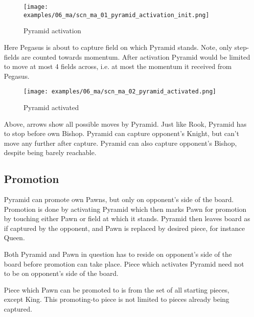 \noindent
\begin{figure}[!h]
\texttt{[image: examples/06\_ma/scn\_ma\_01\_pyramid\_activation\_init.png]}
\caption{Pyramid activation}
\label{fig:scn_ma_01_pyramid_activation_init}
\end{figure}

Here Pegasus is about to capture field on which Pyramid stands. Note, only
step-fields are counted towards momentum. After activation Pyramid would be
limited to move at most 4 fields across, i.e. at most the momentum it received
from Pegasus.

\clearpage %

\noindent
\begin{figure}[!h]
\texttt{[image: examples/06\_ma/scn\_ma\_02\_pyramid\_activated.png]}
\caption{Pyramid activated}
\label{fig:scn_ma_02_pyramid_activated}
\end{figure}

Above, arrows show all possible moves by Pyramid. Just like Rook, Pyramid has to
stop before own Bishop. Pyramid can capture opponent's Knight, but can't move any
further after capture. Pyramid can also capture opponent's Bishop, despite being
barely reachable.

\clearpage %

\subsection*{Promotion}
\label{sec:Mayan Ascendancy/Pyramid/Promotion}

Pyramid can promote own Pawns, but only on opponent's side of the board.
Promotion is done by activating Pyramid which then marks Pawn for promotion
by touching either Pawn or field at which it stands. Pyramid then leaves
board as if captured by the opponent, and Pawn is replaced by desired piece,
for instance Queen.

Both Pyramid and Pawn in question has to reside on opponent's side of the
board before promotion can take place. Piece which activates Pyramid need
not to be on opponent's side of the board.

Piece which Pawn can be promoted to is from the set of all starting pieces,
except King. This promoting-to piece is not limited to pieces already being
captured.

